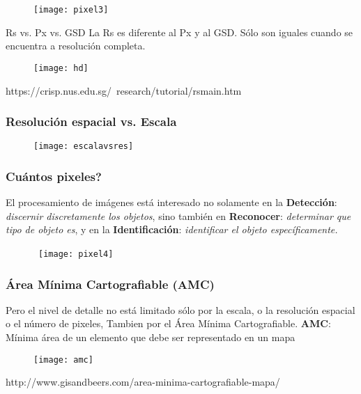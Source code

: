 \documentclass[14pt]{beamer}
\begin{document}
\begin{frame}
 \begin{figure}
    \centering
    \texttt{[image: pixel3]}
  \end{figure}
\end{frame}
\begin{frame}
\begin{exampleblock}{Rs vs. Px vs. GSD}
\small{La Rs es diferente al Px y al GSD. Sólo son iguales cuando se encuentra a resolución completa.}
\end{exampleblock}
 \begin{figure}
    \centering
    \texttt{[image: hd]}
  \end{figure}
\tiny{https://crisp.nus.edu.sg/~research/tutorial/rsmain.htm}
\end{frame}
\begin{frame}
\frametitle{Resolución espacial vs. Escala}
 \begin{figure}
    \centering
    \texttt{[image: escalavsres]}
  \end{figure}
\end{frame}
\begin{frame}
\frametitle{Cuántos pixeles?}
\small{El procesamiento de imágenes está interesado no solamente en la \textbf{Detección}: \emph{discernir discretamente los objetos}, sino también en \textbf{Reconocer}: \emph{determinar que tipo de objeto es}, y en la \textbf{Identificación}: \emph{identificar el objeto específicamente.}}
 \begin{figure}
    \centering
\    \texttt{[image: pixel4]}
  \end{figure}
\end{frame}
\begin{frame}
\frametitle{Área Mínima Cartografiable (AMC)}
\scriptsize{Pero el nivel de detalle no está limitado sólo por la escala, o la resolución espacial o el número de pixeles, Tambien por el Área Mínima Cartografiable.}\vfill
\small{\textbf{AMC}: Mínima área de un elemento que debe ser representado en un mapa}
 \begin{figure}
    \centering
    \texttt{[image: amc]}
  \end{figure}
\tiny{http://www.gisandbeers.com/area-minima-cartografiable-mapa/}
\end{frame}
\end{document}
